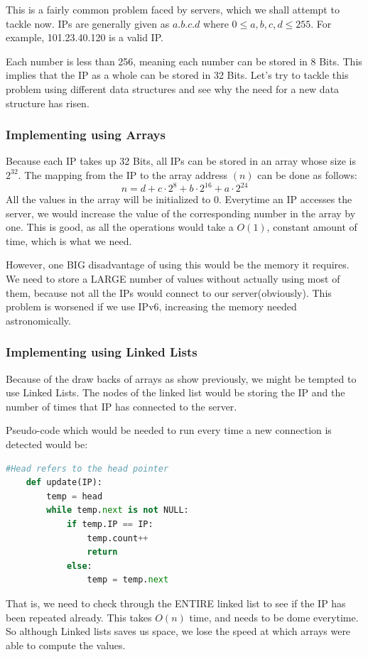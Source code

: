 \documentclass{article}
\theoremstyle{definition}
\theoremstyle{example}
\begin{document}
This is a fairly common problem faced by servers, which we shall attempt to tackle now. IPs are generally given as $a.b.c.d$ where $0\leq a,b,c,d \leq 255$. For example, 101.23.40.120 is a valid IP. \par
\vspace{4mm}
Each number is less than 256, meaning each number can be stored in 8 Bits. This implies that the IP as a whole can be stored in 32 Bits. Let's try to tackle this problem using different data structures and see why the need for a new data structure has risen.

\subsubsection{\Large Implementing using Arrays}
\hspace{4mm}Because each IP takes up 32 Bits, all IPs can be stored in an array whose size is $2^{32}$. The mapping from the IP to the array address $(n)$ can be done as follows:
\[n = d + c\cdot 2^8 + b\cdot 2^{16} + a\cdot 2^{24}\]
All the values in the array will be initialized to $0$. Everytime an IP accesses the server, we would increase the value of the corresponding number in the array by one. This is good, as all the operations would take a $O(1)$, constant amount of time, which is what we need.\par
\vspace{4mm}
However, one BIG disadvantage of using this would be the memory it requires. We need to store a LARGE number of values without actually using most of them, because not all the IPs would connect to our server(obviously). This problem is worsened if we use IPv6, increasing the memory needed astronomically.

\subsubsection{\Large Implementing using Linked Lists}
\hspace{4mm} Because of the draw backs of arrays as show previously, we might be tempted to use Linked Lists. The nodes of the linked list would be storing the IP and the number of times that IP has connected to the server.\par
\vspace{4mm}
Pseudo-code which would be needed to run every time a new connection is detected would be:
\vspace{3mm}
\begin{lstlisting}[language = python, basicstyle = \Large]
    #Head refers to the head pointer
    def update(IP):
        temp = head
        while temp.next is not NULL:
            if temp.IP == IP:
                temp.count++
                return
            else:
                temp = temp.next
\end{lstlisting}
\vspace{3mm}
That is, we need to check through the ENTIRE linked list to see if the IP has been repeated already. This takes $O(n)$ time, and needs to be dome everytime. So although Linked lists saves us space, we lose the speed at which arrays were able to compute the values.
\end{document}

